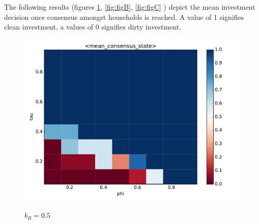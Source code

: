 \newpage

The following results (figures \ref{fig:figA}, \ref{fig:figB}, \ref{fig:figC} ) depict the mean investment decision once consensus amongst households is reached. A value of 1 signifies clean investment, a values of 0 signifies dirty investment.

\begin{minipage}{.55 \textwidth}
	\begin{figure}[H]
		\centering
		\includegraphics[width = \linewidth]{figures/mean_consensus_stateb_r0o5.pdf}

	\end{figure}
\end{minipage}\begin{minipage}{.33 \textwidth}
	\begin{figure}[H]
		\caption{$b_R = 0.5$\label{fig:figA}}
		
	\end{figure}
\end{minipage}
\vspace{-1cm}


